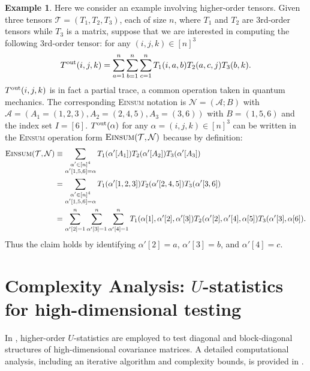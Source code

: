 \documentclass[12pt]{article}
\theoremstyle{plain}
\theoremstyle{definition}
\newtheorem{example}{Example}
\def\Einsum{\textsc{Einsum}}
\newcommand{\tensorcontraction}{\textsc{Einsum}}
\def\calA{\mathcal{A}}
\def\calT{\mathcal{T}}
\def\calN{\mathcal{N}}
\begin{document}
\begin{bibunit}[agsm]
\allowdisplaybreaks
\begin{example}
\label{eg:tensor}
Here we consider an example involving higher-order tensors. Given three tensors $\calT = (T_1, T_2, T_3)$, each of size $n$, where $T_1$ and $T_2$ are 3rd-order tensors while $T_3$ is a matrix, suppose that we are interested in computing the following 3rd-order tensor: for any $(i, j, k) \in [n]^{3}$
\begin{align*}
T^{\rm out} (i, j, k) = \sum_{a = 1}^{n} \sum_{b = 1}^{n} \sum_{c = 1}^{n} T_{1} (i, a, b) T_{2} (a, c, j) T_{3} (b, k).
\end{align*}
$T^{\rm out} (i, j, k)$ is in fact a partial trace, a common operation taken in quantum mechanics. The corresponding \Einsum{} notation is $\calN = (\calA; B)$ with $\calA = (A_1 = (1, 2, 3), A_2 = (2, 4, 5), A_3 = (3, 6))$ with $B = (1, 5, 6)$ and the index set $I = [6]$. $T^{\rm out} (\alpha)$ for any $\alpha = (i, j, k) \in [n]^{3}$ can be written in the \Einsum{} operation form $\tensorcontraction(\calT, \calN)$ because by definition:
\begin{align*}
\tensorcontraction (\calT, \calN) & \equiv \sum_{\substack{\alpha' \in [n]^4 \\ \alpha' [1, 5, 6] = \alpha}} T_1 (\alpha' [A_1]) T_2 (\alpha' [A_2]) T_3 (\alpha' [A_3]) \\
& = \sum_{\substack{\alpha' \in [n]^4 \\ \alpha' [1, 5, 6] = \alpha}} T_1 (\alpha' [1, 2, 3]) T_2 (\alpha' [2, 4, 5]) T_3 (\alpha' [3, 6]) \\
& = \sum_{\alpha' [2] = 1}^{n} \sum_{\alpha' [3] = 1}^{n} \sum_{\alpha' [4] = 1}^{n} T_{1} (\alpha [1], \alpha' [2], \alpha' [3]) T_{2} (\alpha' [2], \alpha' [4], \alpha [5]) T_{3} (\alpha' [3], \alpha [6]).
\end{align*}
Thus the claim holds by identifying $\alpha' [2] = a$, $\alpha' [3] = b$, and $\alpha' [4] = c$.
\end{example}

\section{Complexity Analysis: $U$-statistics for high-dimensional testing}
\label{app:examples_complexity}

In \cite{he2021asymptotically,lai2023block}, higher-order $U$-statistics are employed to test diagonal and block-diagonal structures of high-dimensional covariance matrices. A detailed computational analysis, including an iterative algorithm and complexity bounds, is provided in \cite{he2021asymptotically}.


\end{bibunit}
\end{document}

